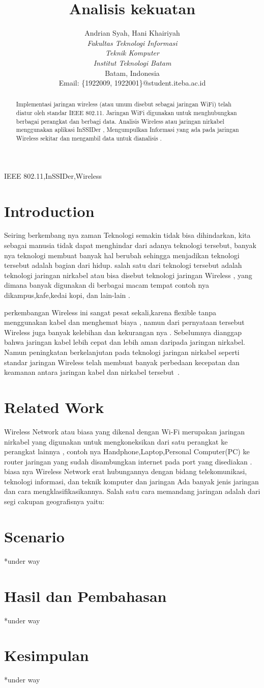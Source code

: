 \documentclass[conference]{IEEEtran}
\title{Analisis kekuatan}
\author{Andrian Syah\IEEEauthorrefmark{1}, Hani Khairiyah\IEEEauthorrefmark{2}\\
\textit{Fakultas Teknologi Informasi}\\
\textit{Teknik Komputer}\\
\textit{Institut Teknologi Batam}\\
Batam, Indonesia\\
Email: \{\IEEEauthorrefmark{1}1922009, \IEEEauthorrefmark{2}1922001\}@student.iteba.ac.id}
\begin{document}
\maketitle

\begin{abstract}
    Implementasi jaringan wireless (atau umum disebut sebagai jaringan WiFi) telah diatur oleh standar
    IEEE 802.11. Jaringan WiFi digunakan untuk menghubungkan berbagai perangkat dan berbagi data.
    Analisis Wireless atau jaringan nirkabel menggunakan aplikasi InSSIDer ,
    Mengumpulkan Informasi yang ada pada jaringan Wireless sekitar dan mengambil data 
    untuk dianalisis .
\end{abstract}

\begin{IEEEkeywords}
    IEEE 802.11,InSSIDer,Wireless
\end{IEEEkeywords}

\section{Introduction}
Seiring berkembang nya zaman Teknologi semakin tidak bisa dihindarkan, 
kita sebagai manusia tidak dapat menghindar dari adanya teknologi tersebut,
banyak nya teknologi membuat banyak hal berubah sehingga menjadikan teknologi tersebut 
adalah bagian dari hidup. salah satu dari teknologi tersebut adalah teknologi jaringan nirkabel
atau bisa disebut teknologi jaringan Wireless , yang dimana banyak digunakan di berbagai macam tempat 
contoh nya dikampus,kafe,kedai kopi, dan lain-lain .

perkembangan Wireless ini sangat pesat sekali,karena flexible tanpa menggunakan kabel dan menghemat biaya 
, namun dari pernyataan tersebut Wireless juga banyak kelebihan dan kekurangan nya . 
Sebelumnya dianggap bahwa jaringan kabel lebih cepat dan lebih aman daripada jaringan nirkabel.
Namun peningkatan berkelanjutan pada teknologi jaringan nirkabel seperti standar jaringan Wireless
 telah membuat banyak perbedaan kecepatan dan keamanan antara jaringan kabel dan nirkabel tersebut~.
\section{Related Work}
Wireless Network atau biasa yang dikenal dengan Wi-Fi merupakan jaringan nirkabel yang digunakan
untuk mengkoneksikan dari satu perangkat ke perangkat lainnya ,
contoh nya Handphone,Laptop,Personal Computer(PC)
ke router jaringan yang sudah disambungkan internet pada port yang disediakan . biasa nya Wireless Network  
erat hubungannya dengan bidang telekomunikasi, teknologi informasi, dan teknik komputer dan jaringan 
Ada banyak jenis jaringan dan cara mengklasifikasikannya. Salah satu cara memandang jaringan adalah dari segi cakupan geografisnya yaitu:

\section{Scenario}
*under way
\section{Hasil dan Pembahasan}
*under way
\section{Kesimpulan}
*under way


\end{document}
